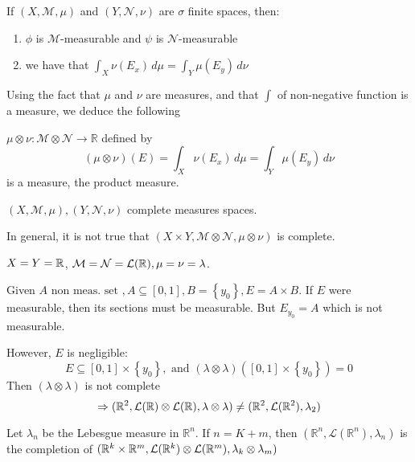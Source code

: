 \begin{theorem}
    If \(\left(X, \mathcal{M}, \mu \right)\) and \(\left(Y, \mathcal{N}, \nu \right)\) are \(\sigma\) finite spaces, then:
    \begin{enumerate}
        \item \(\phi\) is \(\mathcal{M}\)-measurable and \(\psi\) is \( \mathcal{N}\)-measurable
        \item we have that \(\int_X \nu(E_x) \, d\mu = \int_Y \mu(E_y) \, d\nu \)
    \end{enumerate}
\end{theorem}

Using the fact that \(\mu \) and \(\nu\) are measures, and that \(\int\) of non-negative function is a measure, we deduce the following

\begin{theorem}
    \(\mu \otimes \nu : \mathcal{M} \otimes \mathcal{N} \rightarrow \mathbb{R} \) defined by
    \[ \left(\mu \otimes \nu \right)(E) = \int_X \nu(E_x) \, d\mu = \int_Y \mu(E_y) \, d\nu\]
    is a measure, the product measure.
\end{theorem}

\begin{remark} 
    \(\left(X, \mathcal{M}, \mu \right), \left(Y, \mathcal{N}, \nu \right)\) complete measures spaces. 
    
    In general, it is not true that \((X \times Y, \mathcal{M} \otimes \mathcal{N}, \mu \otimes \nu)\) is complete.
\end{remark}
\begin{example}
    \(X = Y = \mathbb{R}\), \(\mathcal{M} = \mathcal{N} = \mathcal{L}(\mathbb{R}), \mu = \nu = \lambda\).
    
\end{example}
Given \(A \mbox{ non meas. set }, A \subseteq [0,1], B = \left\{ y_0 \right\}, E = A \times B\). 
If \(E\) were measurable, then its sections must be measurable. But \(E_{y_0} = A\) which is not measurable.

However, \(E\) is negligible:
\[
    E \subseteq [0,1] \times \left\{ y_0 \right\}, \mbox{ and } \left(\lambda \otimes \lambda\right)\left([0,1] \times \left\{ y_0 \right\}\right) = 0
\]
Then \((\lambda \otimes \lambda)\) is not complete 
\[
    \Rightarrow (\mathbb{R}^2, \mathcal{L}(\mathbb{R}) \otimes \mathcal{L}(\mathbb{R}), \lambda \otimes \lambda) \neq (\mathbb{R}^2, \mathcal{L}(\mathbb{R}^2), \lambda_2)
\]
\begin{theorem}
    Let \(\lambda_n\) be the Lebesgue measure in \(\mathbb{R}^n\). 
    If \(n= K+m\), then \(\left(\mathbb{R}^n, \mathcal{L}(\mathbb{R}^n), \lambda_n \right)\) is the completion of \( ( \mathbb{R}^k \times \mathbb{R}^m, \mathcal{L}(\mathbb{R}^k) \otimes \mathcal{L}(\mathbb{R}^m),\lambda_k \otimes \lambda_m )\)
\end{theorem}
